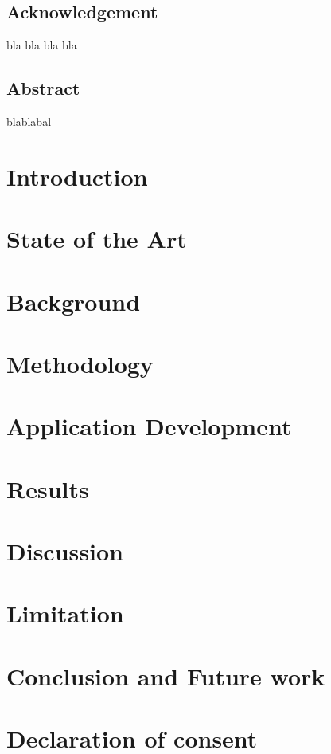 \documentclass [12pt, oneside] {book}
\begin{document}

\section*{Acknowledgement}
bla bla bla bla
\newpage
\section*{Abstract}
blablabal
\tableofcontents
\listoffigures


\printglossary[type=\acronymtype, title=Abbreviations, nonumberlist]


\chapter{Introduction}

\chapter{State of the Art }

\chapter{Background}

\chapter{Methodology}

\chapter{Application Development}

\chapter{Results}

\chapter{Discussion}

\chapter{Limitation}

\chapter{Conclusion and Future work}





\appendix
\chapter{Declaration of consent}

\end{document}
